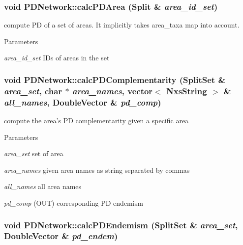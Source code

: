 \hypertarget{classPDNetwork_ae591e54724f7d6f31b0b1ba264bfb876}{
\subsubsection[{calcPDArea}]{\setlength{\rightskip}{0pt plus 5cm}void PDNetwork::calcPDArea ({\bf Split} \& {\em area\_\-id\_\-set})}}
\label{classPDNetwork_ae591e54724f7d6f31b0b1ba264bfb876}
compute PD of a set of areas. It implicitly takes area\_\-taxa map into account. 
\begin{DoxyParams}{Parameters}
\item[{\em area\_\-id\_\-set}]IDs of areas in the set \end{DoxyParams}
\hypertarget{classPDNetwork_aff4ede123b2e4460a44d43fc504427ca}{
\subsubsection[{calcPDComplementarity}]{\setlength{\rightskip}{0pt plus 5cm}void PDNetwork::calcPDComplementarity ({\bf SplitSet} \& {\em area\_\-set}, \/  char $\ast$ {\em area\_\-names}, \/  vector$<$ {\bf NxsString} $>$ \& {\em all\_\-names}, \/  DoubleVector \& {\em pd\_\-comp})}}
\label{classPDNetwork_aff4ede123b2e4460a44d43fc504427ca}
compute the area's PD complementarity given a specific area 
\begin{DoxyParams}{Parameters}
\item[{\em area\_\-set}]set of area \item[{\em area\_\-names}]given area names as string separated by commas \item[{\em all\_\-names}]all area names \item[{\em pd\_\-comp}](OUT) corresponding PD endemism \end{DoxyParams}
\hypertarget{classPDNetwork_ae578ebf3ba8d3dff2275b7961abd9574}{
\subsubsection[{calcPDEndemism}]{\setlength{\rightskip}{0pt plus 5cm}void PDNetwork::calcPDEndemism ({\bf SplitSet} \& {\em area\_\-set}, \/  DoubleVector \& {\em pd\_\-endem})}}
